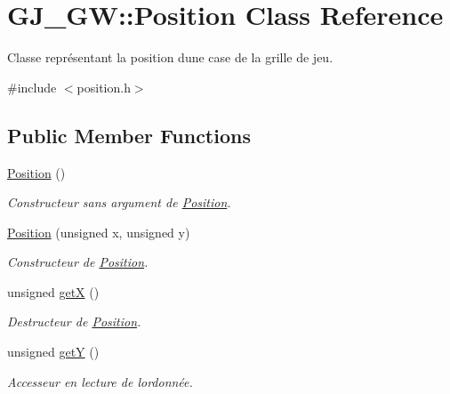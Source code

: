 \hypertarget{class_g_j___g_w_1_1_position}{}\section{G\+J\+\_\+\+GW\+:\+:Position Class Reference}
\label{class_g_j___g_w_1_1_position}


Classe représentant la position d\textquotesingle{}une case de la grille de jeu.  




{\ttfamily \#include $<$position.\+h$>$}

\subsection*{Public Member Functions}
\begin{DoxyCompactItemize}
\item 
\hypertarget{class_g_j___g_w_1_1_position_a90913522e4c57a095bd9c3669f708c7b}{}\label{class_g_j___g_w_1_1_position_a90913522e4c57a095bd9c3669f708c7b} 
\hyperlink{class_g_j___g_w_1_1_position_a90913522e4c57a095bd9c3669f708c7b}{Position} ()
\begin{DoxyCompactList}\small\item\em Constructeur sans argument de \hyperlink{class_g_j___g_w_1_1_position}{Position}. \end{DoxyCompactList}\item 
\hyperlink{class_g_j___g_w_1_1_position_ab3e634a5c6392113d2b5f6ecc214997a}{Position} (unsigned x, unsigned y)
\begin{DoxyCompactList}\small\item\em Constructeur de \hyperlink{class_g_j___g_w_1_1_position}{Position}. \end{DoxyCompactList}\item 
unsigned \hyperlink{class_g_j___g_w_1_1_position_a0b6d52cb999972584a19bbd5f72052d2}{getX} ()
\begin{DoxyCompactList}\small\item\em Destructeur de \hyperlink{class_g_j___g_w_1_1_position}{Position}. \end{DoxyCompactList}\item 
unsigned \hyperlink{class_g_j___g_w_1_1_position_adc9a6735a8f67edda3a1d347aa9c8211}{getY} ()
\begin{DoxyCompactList}\small\item\em Accesseur en lecture de l\textquotesingle{}ordonnée. \end{DoxyCompactList}\item 

\end{DoxyCompactItemize}
